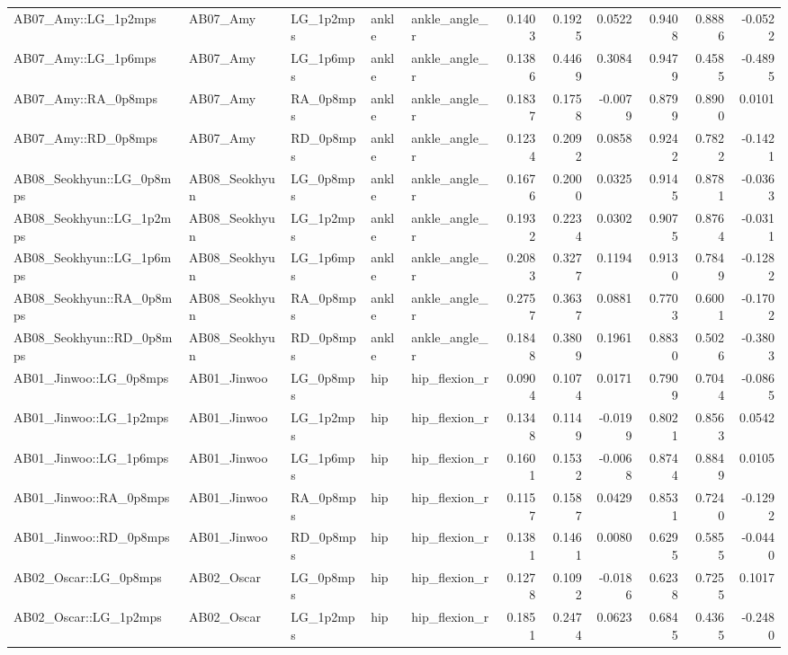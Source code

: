 \begin{table}
\begin{tabular}{lllllrrrrrr}
AB07_Amy::LG_1p2mps & AB07_Amy & LG_1p2mps & ankle & ankle_angle_r & 0.1403 & 0.1925 & 0.0522 & 0.9408 & 0.8886 & -0.0522 \\
AB07_Amy::LG_1p6mps & AB07_Amy & LG_1p6mps & ankle & ankle_angle_r & 0.1386 & 0.4469 & 0.3084 & 0.9479 & 0.4585 & -0.4895 \\
AB07_Amy::RA_0p8mps & AB07_Amy & RA_0p8mps & ankle & ankle_angle_r & 0.1837 & 0.1758 & -0.0079 & 0.8799 & 0.8900 & 0.0101 \\
AB07_Amy::RD_0p8mps & AB07_Amy & RD_0p8mps & ankle & ankle_angle_r & 0.1234 & 0.2092 & 0.0858 & 0.9242 & 0.7822 & -0.1421 \\
AB08_Seokhyun::LG_0p8mps & AB08_Seokhyun & LG_0p8mps & ankle & ankle_angle_r & 0.1676 & 0.2000 & 0.0325 & 0.9145 & 0.8781 & -0.0363 \\
AB08_Seokhyun::LG_1p2mps & AB08_Seokhyun & LG_1p2mps & ankle & ankle_angle_r & 0.1932 & 0.2234 & 0.0302 & 0.9075 & 0.8764 & -0.0311 \\
AB08_Seokhyun::LG_1p6mps & AB08_Seokhyun & LG_1p6mps & ankle & ankle_angle_r & 0.2083 & 0.3277 & 0.1194 & 0.9130 & 0.7849 & -0.1282 \\
AB08_Seokhyun::RA_0p8mps & AB08_Seokhyun & RA_0p8mps & ankle & ankle_angle_r & 0.2757 & 0.3637 & 0.0881 & 0.7703 & 0.6001 & -0.1702 \\
AB08_Seokhyun::RD_0p8mps & AB08_Seokhyun & RD_0p8mps & ankle & ankle_angle_r & 0.1848 & 0.3809 & 0.1961 & 0.8830 & 0.5026 & -0.3803 \\
AB01_Jinwoo::LG_0p8mps & AB01_Jinwoo & LG_0p8mps & hip & hip_flexion_r & 0.0904 & 0.1074 & 0.0171 & 0.7909 & 0.7044 & -0.0865 \\
AB01_Jinwoo::LG_1p2mps & AB01_Jinwoo & LG_1p2mps & hip & hip_flexion_r & 0.1348 & 0.1149 & -0.0199 & 0.8021 & 0.8563 & 0.0542 \\
AB01_Jinwoo::LG_1p6mps & AB01_Jinwoo & LG_1p6mps & hip & hip_flexion_r & 0.1601 & 0.1532 & -0.0068 & 0.8744 & 0.8849 & 0.0105 \\
AB01_Jinwoo::RA_0p8mps & AB01_Jinwoo & RA_0p8mps & hip & hip_flexion_r & 0.1157 & 0.1587 & 0.0429 & 0.8531 & 0.7240 & -0.1292 \\
AB01_Jinwoo::RD_0p8mps & AB01_Jinwoo & RD_0p8mps & hip & hip_flexion_r & 0.1381 & 0.1461 & 0.0080 & 0.6295 & 0.5855 & -0.0440 \\
AB02_Oscar::LG_0p8mps & AB02_Oscar & LG_0p8mps & hip & hip_flexion_r & 0.1278 & 0.1092 & -0.0186 & 0.6238 & 0.7255 & 0.1017 \\
AB02_Oscar::LG_1p2mps & AB02_Oscar & LG_1p2mps & hip & hip_flexion_r & 0.1851 & 0.2474 & 0.0623 & 0.6845 & 0.4365 & -0.2480 \\

\end{tabular}
\end{table}
